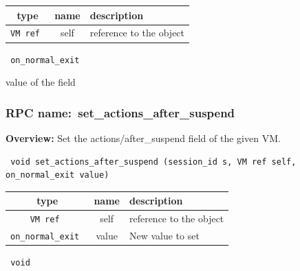 
 
\vspace{0.3cm}
\begin{tabular}{|c|c|p{7cm}|}
 \hline
{\bf type} & {\bf name} & {\bf description} \\ \hline
{\tt VM ref } & self & reference to the object \\ \hline 

\end{tabular}

\vspace{0.3cm}

{\tt 
on\_normal\_exit
}


value of the field
\vspace{0.3cm}
\vspace{0.3cm}
\vspace{0.3cm}
\subsubsection{RPC name:~set\_actions\_after\_suspend}

{\bf Overview:} 
Set the actions/after\_suspend field of the given VM.

\begin{verbatim} void set_actions_after_suspend (session_id s, VM ref self, on_normal_exit value)\end{verbatim}



 
\vspace{0.3cm}
\begin{tabular}{|c|c|p{7cm}|}
 \hline
{\bf type} & {\bf name} & {\bf description} \\ \hline
{\tt VM ref } & self & reference to the object \\ \hline 

{\tt on\_normal\_exit } & value & New value to set \\ \hline 

\end{tabular}

\vspace{0.3cm}

{\tt 
void
}



\vspace{0.3cm}
\vspace{0.3cm}
\vspace{0.3cm}
